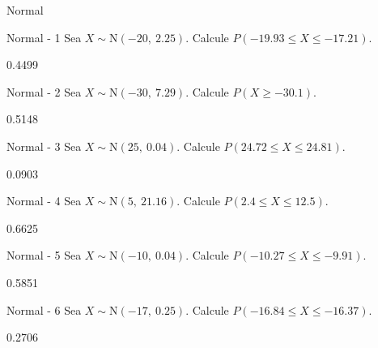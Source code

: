 \documentclass[a4,11pt]{aleph-notas}
\newcommand{\Norm}{\text{N}}
\begin{document}
\begin{quiz}{Normal}

\begin{numerical}[tolerance=0.001]%
    {Normal - 1}
    Sea \( X \sim \Norm(-20,\ 2.25) \). Calcule \( P(-19.93 \leq X \leq -17.21) \).
    \item[] 0.4499
\end{numerical}

\begin{numerical}[tolerance=0.001]%
    {Normal - 2}
    Sea \( X \sim \Norm(-30,\ 7.29) \). Calcule \( P(X \geq -30.1) \).
    \item[] 0.5148
\end{numerical}

\begin{numerical}[tolerance=0.001]%
    {Normal - 3}
    Sea \( X \sim \Norm(25,\ 0.04) \). Calcule \( P(24.72 \leq X \leq 24.81) \).
    \item[] 0.0903
\end{numerical}

\begin{numerical}[tolerance=0.001]%
    {Normal - 4}
    Sea \( X \sim \Norm(5,\ 21.16) \). Calcule \( P(2.4 \leq X \leq 12.5) \).
    \item[] 0.6625
\end{numerical}

\begin{numerical}[tolerance=0.001]%
    {Normal - 5}
    Sea \( X \sim \Norm(-10,\ 0.04) \). Calcule \( P(-10.27 \leq X \leq -9.91) \).
    \item[] 0.5851
\end{numerical}

\begin{numerical}[tolerance=0.001]%
    {Normal - 6}
    Sea \( X \sim \Norm(-17,\ 0.25) \). Calcule \( P(-16.84 \leq X \leq -16.37) \).
    \item[] 0.2706
\end{numerical}


\end{quiz}
\end{document}
